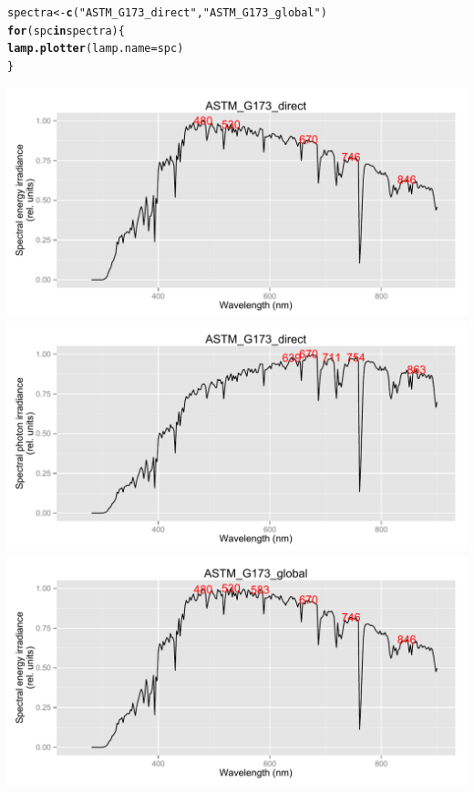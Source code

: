 \documentclass{article}\usepackage[]{graphicx}\usepackage[]{color}
\makeatletter
\newcommand{\hlstr}[1]{\textcolor[rgb]{0.192,0.494,0.8}{#1}}%
\newcommand{\hlstd}[1]{\textcolor[rgb]{0.345,0.345,0.345}{#1}}%
\newcommand{\hlkwa}[1]{\textcolor[rgb]{0.161,0.373,0.58}{\textbf{#1}}}%
\newcommand{\hlkwb}[1]{\textcolor[rgb]{0.69,0.353,0.396}{#1}}%
\newcommand{\hlkwc}[1]{\textcolor[rgb]{0.333,0.667,0.333}{#1}}%
\newcommand{\hlkwd}[1]{\textcolor[rgb]{0.737,0.353,0.396}{\textbf{#1}}}%
\newenvironment{kframe}{%
 \def\at@end@of@kframe{}%
 \ifinner\ifhmode%
  \def\at@end@of@kframe{\end{minipage}}%
  \begin{minipage}{\columnwidth}%
 \fi\fi%
 \def\FrameCommand##1{\hskip\@totalleftmargin \hskip-\fboxsep
 \colorbox{shadecolor}{##1}\hskip-\fboxsep
     \hskip-\linewidth \hskip-\@totalleftmargin \hskip\columnwidth}%
 \MakeFramed {\advance\hsize-\width
   \@totalleftmargin\z@ \linewidth\hsize
   \@setminipage}}%
 {\par\unskip\endMakeFramed%
 \at@end@of@kframe}
\newenvironment{knitrout}{}{} %
\makeatother
\begin{document}
\begin{knitrout}\footnotesize
{}\color{fgcolor}\begin{kframe}
\begin{alltt}
\hlstd{spectra} \hlkwb{<-} \hlkwd{c}\hlstd{(}\hlstr{"ASTM_G173_direct"}\hlstd{,} \hlstr{"ASTM_G173_global"}\hlstd{)}
\hlkwa{for} \hlstd{(spc} \hlkwa{in} \hlstd{spectra) \{}
    \hlkwd{lamp.plotter}\hlstd{(}\hlkwc{lamp.name} \hlstd{= spc)}
\hlstd{\}}
\end{alltt}
\end{kframe}

{\centering \includegraphics[width=.95\textwidth]{figure/pos-terrestrial-std1} 
\includegraphics[width=.95\textwidth]{figure/pos-terrestrial-std2} 
\includegraphics[width=.95\textwidth]{figure/pos-terrestrial-std3} 
}
\end{knitrout}
\end{document}
